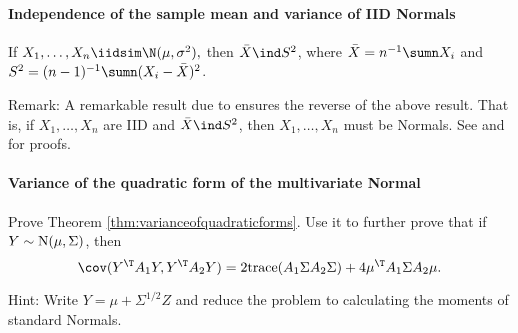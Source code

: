 \paragraph{Independence of the sample mean and variance of IID Normals}\label{hw00math2::independence-mean-variance}

If $X_{1},\ldots,X_{n} \iidsim \N(\mu,\sigma^{2}),$ then $\bar{X}\ind S^{2}$,
where $\bar{X}=n^{-1}\sumn X_{i}$ and $S^{2}=(n-1)^{-1}\sumn(X_{i}-\bar{X})^{2}$.



Remark: A remarkable result due to \citet{geary1936distribution} ensures the reverse of the above result. That is, if $X_{1},\ldots,X_{n} $ are IID and $\bar{X}\ind S^{2}$, then $X_{1},\ldots,X_{n} $ must be Normals. See \citet{lukacs1942characterization} and \citet{benhamou2018three} for proofs. 



\paragraph{Variance of the quadratic form of the multivariate Normal}\label{hw00math2::variance-quadratic}

Prove Theorem \ref{thm:varianceofquadraticforms}. Use it to further prove that if $Y\sim\textup{N}(\mu,\Sigma)$, then
$$
\cov(  Y^{\T}A_1Y, Y^{\T}A_2Y)
= 2\textup{trace}(A_1\Sigma A_2\Sigma)+4\mu^{\T}A_1\Sigma A_2\mu . 
$$


Hint: 
Write $Y = \mu + \Sigma^{1/2} Z$ and reduce the problem to calculating the moments of standard Normals. 





 

